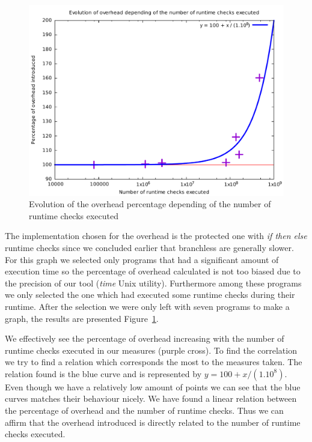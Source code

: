 \documentclass[11pt]{sdm}
\begin{document}
\begin{figure}[!ht]
\centering
\includegraphics[width=1\textwidth]{images/correlation_graph.pdf}
\caption{Evolution of the overhead percentage depending of the number of runtime checks executed}
\label{correlation_graph}
\end{figure}

The implementation chosen for the overhead is the protected one with \textit{if then else} runtime checks since we concluded earlier that branchless are generally slower.
For this graph we selected only programs that had a significant amount of execution time so the percentage of overhead calculated is not too biased due to the precision of our tool (\textit{time} Unix utility). Furthermore among these programs we only selected the one which had executed some runtime checks during their runtime. 
After the selection we were only left with seven programs to make a graph, the results are presented Figure~\ref{correlation_graph}.

We effectively see the percentage of overhead increasing with the number of runtime checks executed in our measures (purple cross). To find the correlation we try to find a relation which corresponds the most to the measures taken. The relation found is the blue curve and is represented by $y=100+x/(1.10^8)$. Even though we have a relatively low amount of points we can see that the blue curves matches their behaviour nicely. We have found a linear relation between the percentage of overhead and the number of runtime checks. Thus we can affirm that the overhead introduced is directly related to the number of runtime checks executed.
\end{document}
